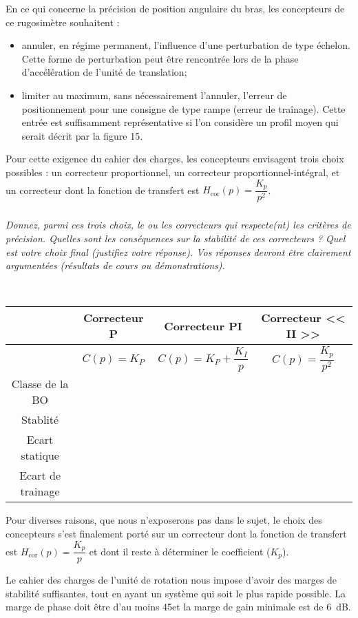 En ce qui concerne la précision de position angulaire du bras, les concepteurs de ce rugosimètre
souhaitent :
\begin{itemize}
\item annuler, en régime permanent, l’influence d’une perturbation de type échelon. Cette forme de
perturbation peut être rencontrée lors de la phase d’accélération de l’unité de translation;
\item limiter au maximum, sans nécessairement l’annuler, l’erreur de positionnement pour une consigne
de type rampe (erreur de traînage). Cette entrée est suffisamment représentative si l’on considère un
profil moyen qui serait décrit par la figure 15.
\end{itemize}
Pour cette exigence du cahier des charges, les concepteurs envisagent trois choix possibles : un correcteur
proportionnel, un correcteur proportionnel-intégral, et un correcteur dont la fonction de transfert est
$H_{\text{cor}}(p) = \dfrac{K_p}{p^2}$.


\subparagraph{\label{q_12}}\textit{Donnez, parmi ces trois choix, le ou les correcteurs qui respecte(nt) les critères de précision.
Quelles sont les conséquences sur la stabilité de ces correcteurs ?
Quel est votre choix final (justifiez votre réponse).
Vos réponses devront être clairement argumentées (résultats de cours ou démonstrations).}
\ifprof
\begin{corrige} ~\\
\begin{tabular}{cccc}
\hline
& Correcteur P & Correcteur PI & Correcteur << II >> \\\hline
& $C(p)=K_P$    & $C(p)=K_P + \dfrac{K_I}{p}$ & $C(p)= \dfrac{K_p}{p^2}$  \\  \hline
Classe de la BO & & &  \\\hline
Stablité  & & & \\\hline
Ecart statique & & & \\\hline
Ecart de trainage & & & \\\hline
\end{tabular}

\end{corrige}
\else
\fi


Pour diverses raisons, que nous n’exposerons pas dans le sujet, le choix des concepteurs s’est finalement
porté sur un correcteur dont la fonction de transfert est 
$H_{\text{cor}}(p) = \dfrac{K_p}{p}$ et dont il reste à déterminer le
coefficient ($K_p$).


Le cahier des charges de l’unité de rotation nous impose d’avoir des marges de stabilité suffisantes, tout en
ayant un système qui soit le plus rapide possible. La marge de phase doit être d’au moins 45\degres et la marge
de gain minimale est de \SI{6}{dB}.

